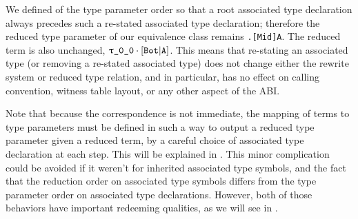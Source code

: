 \documentclass[../generics]{subfiles}
\begin{document}
\begin{example}
We defined  of the type parameter order so that a root associated type declaration always precedes such a re-stated associated type declaration; therefore the reduced type parameter of our equivalence class remains \texttt{\rT.[Mid]A}. The reduced term is also unchanged, $\rT\cdot\assocsym{Bot}{A}$. This means that re-stating an associated type (or removing a re-stated associated type) does not change either the rewrite system or reduced type relation, and in particular, has no effect on calling convention, witness table layout, or any other aspect of the ABI.

Note that because the correspondence is not immediate, the mapping of terms to type parameters must be defined in such a way to output a reduced type parameter given a reduced term, by a careful choice of associated type declaration at each step. This will be explained in . This minor complication could be avoided if it weren't for inherited associated type symbols, and the fact that the reduction order on associated type symbols differs from the type parameter order on associated type declarations. However, both of those behaviors have important redeeming qualities, as we will see in .
\end{example}
\end{document}

